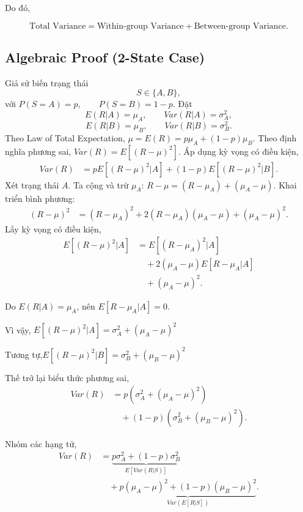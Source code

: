 Do đó,

\[
\boxed{
\text{Total Variance}
=
\text{Within-group Variance}
+
\text{Between-group Variance}.
}
\]

\subsection*{Algebraic Proof (2-State Case)}

Giả sử biến trạng thái
\[
S\in\{A,B\},
\]
với
$
P(S=A)=p,\qquad
P(S=B)=1-p.
$
Đặt
\[
E(R|A)=\mu_A,\qquad
Var(R|A)=\sigma_A^2,
\]
\[
E(R|B)=\mu_B,\qquad
Var(R|B)=\sigma_B^2.
\]
Theo Law of Total Expectation,
$
\mu
=
E(R)
=
p\mu_A+(1-p)\mu_B.
$
Theo định nghĩa phương sai,
$
Var(R)
=
E[(R-\mu)^2].
$
Áp dụng kỳ vọng có điều kiện,
\begin{align*}
Var(R)
&=
pE[(R-\mu)^2|A]
+
(1-p)E[(R-\mu)^2|B].
\end{align*}
Xét trạng thái $A$. Ta cộng và trừ $\mu_A$:
$
R-\mu
=
(R-\mu_A)
+
(\mu_A-\mu).
$
Khai triển bình phương: 
\begin{align*}
(R-\mu)^2
&=
(R-\mu_A)^2
+
2(R-\mu_A)(\mu_A-\mu)
+
(\mu_A-\mu)^2.
\end{align*}
Lấy kỳ vọng có điều kiện,
\begin{align*}
E[(R-\mu)^2|A]
&=
E[(R-\mu_A)^2|A]
\\
&\quad
+
2(\mu_A-\mu)
E[R-\mu_A|A]
\\
&\quad
+
(\mu_A-\mu)^2.
\end{align*}

Do $E(R|A)=\mu_A$, nên $E[R-\mu_A|A]=0$.

Vì vậy, $E[(R-\mu)^2|A] = \sigma_A^2 + (\mu_A-\mu)^2$

Tương tự,$E[(R-\mu)^2|B] = \sigma_B^2 + (\mu_B-\mu)^2$

Thế trở lại biểu thức phương sai,
\begin{align*}
Var(R)
&=
p\left(
\sigma_A^2
+
(\mu_A-\mu)^2
\right)
\\
&\quad+
(1-p)
\left(
\sigma_B^2
+
(\mu_B-\mu)^2
\right).
\end{align*}

Nhóm các hạng tử,
\begin{align*}
Var(R)
&=
\underbrace{
p\sigma_A^2
+
(1-p)\sigma_B^2
}_{E[Var(R|S)]}
\\
&\quad+
\underbrace{
p(\mu_A-\mu)^2
+
(1-p)(\mu_B-\mu)^2
}_{Var(E[R|S])}.
\end{align*}

